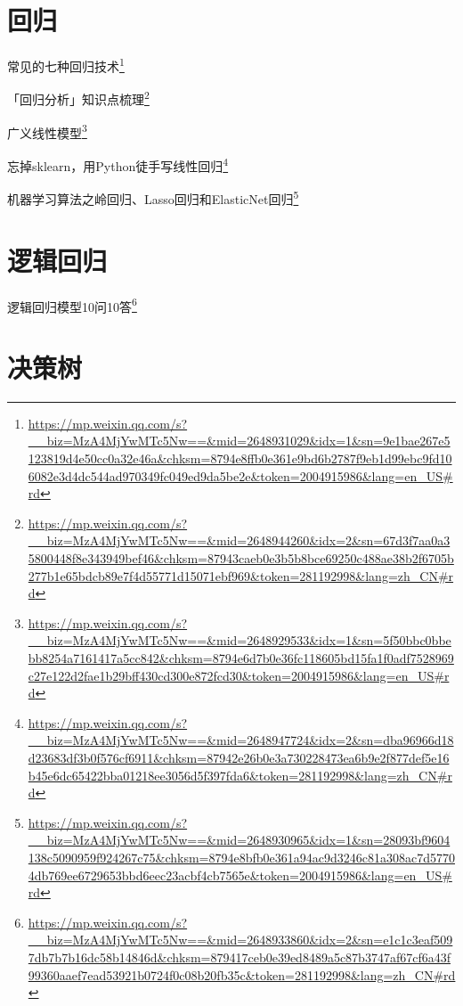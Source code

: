\documentclass[]{ctexbook}
\renewcommand{\href}[2]{#2\footnote{\url{#1}}}
\begin{document}
\hypertarget{ux56deux5f52}{%
\section{回归}\label{ux56deux5f52}}

\href{https://mp.weixin.qq.com/s?__biz=MzA4MjYwMTc5Nw==\&mid=2648931029\&idx=1\&sn=9e1bae267e5123819d4e50cc0a32e46a\&chksm=8794e8ffb0e361e9bd6b2787f9eb1d99ebc9fd106082e3d4dc544ad970349fc049ed9da5be2e\&token=2004915986\&lang=en_US\#rd}{常见的七种回归技术}

\href{https://mp.weixin.qq.com/s?__biz=MzA4MjYwMTc5Nw==\&mid=2648944260\&idx=2\&sn=67d3f7aa0a35800448f8e343949bef46\&chksm=87943caeb0e3b5b8bce69250c488ae38b2f6705b277b1e65bdcb89e7f4d55771d15071ebf969\&token=281192998\&lang=zh_CN\#rd}{「回归分析」知识点梳理}

\href{https://mp.weixin.qq.com/s?__biz=MzA4MjYwMTc5Nw==\&mid=2648929533\&idx=1\&sn=5f50bbc0bbebb8254a7161417a5cc842\&chksm=8794e6d7b0e36fc118605bd15fa1f0adf7528969c27e122d2fae1b29bff430cd300e872fcd30\&token=2004915986\&lang=en_US\#rd}{广义线性模型}

\href{https://mp.weixin.qq.com/s?__biz=MzA4MjYwMTc5Nw==\&mid=2648947724\&idx=2\&sn=dba96966d18d23683df3b0f576cf6911\&chksm=87942e26b0e3a730228473ea6b9e2f877def5e16b45e6dc65422bba01218ee3056d5f397fda6\&token=281192998\&lang=zh_CN\#rd}{忘掉sklearn，用Python徒手写线性回归}

\href{https://mp.weixin.qq.com/s?__biz=MzA4MjYwMTc5Nw==\&mid=2648930965\&idx=1\&sn=28093bf9604138c5090959f924267c75\&chksm=8794e8bfb0e361a94ac9d3246c81a308ac7d57704db769ee6729653bbd6eec23acbf4cb7565e\&token=2004915986\&lang=en_US\#rd}{机器学习算法之岭回归、Lasso回归和ElasticNet回归}

\hypertarget{ux903bux8f91ux56deux5f52}{%
\section{逻辑回归}\label{ux903bux8f91ux56deux5f52}}

\href{https://mp.weixin.qq.com/s?__biz=MzA4MjYwMTc5Nw==\&mid=2648933860\&idx=2\&sn=e1c1c3eaf5097db7b7b16dc58b14846d\&chksm=879417ceb0e39ed8489a5c87b3747af67cf6a43f99360aaef7ead53921b0724f0c08b20fb35c\&token=281192998\&lang=zh_CN\#rd}{逻辑回归模型10问10答}

\hypertarget{ux51b3ux7b56ux6811}{%
\section{决策树}\label{ux51b3ux7b56ux6811}}
\end{document}
